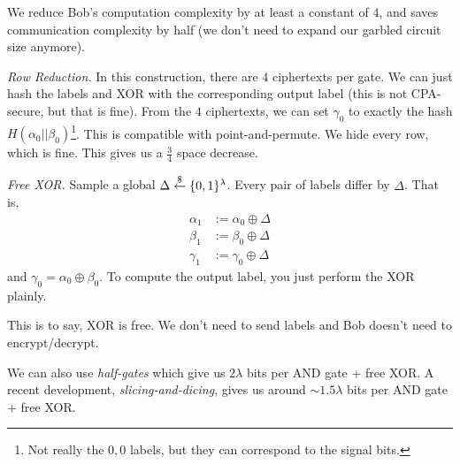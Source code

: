 
We reduce Bob's computation complexity by at least a constant of $4$, and saves communication complexity by half (we don't need to expand our garbled circuit size anymore).

\emph{Row Reduction.} In this construction, there are $4$ ciphertexts per gate. We can just hash the labels and \textsf{XOR} with the corresponding output label (this is not CPA-secure, but that is fine). From the $4$ ciphertexts, we can set $\gamma_0$ to exactly the hash $H(\alpha_0||\beta_0)$\footnote{Not really the $0,0$ labels, but they can correspond to the signal bits.}. This is compatible with point-and-permute. We hide every row, which is fine. This gives us a $\frac{3}{4}$ space decrease.


\emph{Free \textsf{XOR}.} Sample a global $\Delta\overset{\$}{\leftarrow}\{0,1\}^\lambda$. Every pair of labels differ by $\Delta$. That is,
\begin{align*}
    \alpha_1 & :=\alpha_0\oplus \Delta \\
    \beta_1  & :=\beta_0\oplus \Delta  \\
    \gamma_1 & :=\gamma_0\oplus \Delta
\end{align*}
and $\gamma_0 = \alpha_0\oplus \beta_0$. To compute the output label, you just perform the \textsf{XOR} plainly.

This is to say, \textsf{XOR} is free. We don't need to send labels and Bob doesn't need to encrypt/decrypt.


We can also use \emph{half-gates} which give us $2\lambda$ bits per \textsf{AND} gate + free \textsf{XOR}. A recent development, \emph{slicing-and-dicing}, gives us around $\sim 1.5\lambda$ bits per \textsf{AND} gate + free \textsf{XOR}.